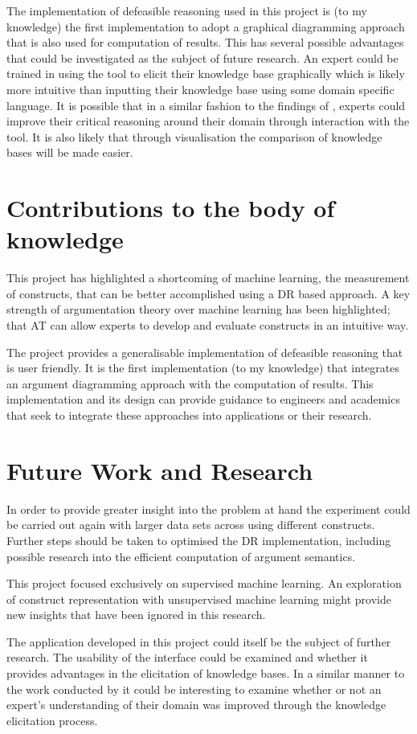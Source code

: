 The implementation of defeasible reasoning used in this project is (to my knowledge) the first implementation to adopt a graphical diagramming approach that is also used for computation of results. This has several possible advantages that could be investigated as the subject of future research. An expert could be trained in using the tool to elicit their knowledge base graphically which is likely more intuitive than inputting their knowledge base using some domain specific language. It is possible that in a similar fashion to the findings of \cite{twardy2004argument}, experts could improve their critical reasoning around their domain through interaction with the tool. It is also likely that through visualisation the comparison of knowledge bases will be made easier. 

\section{Contributions to the body of knowledge}

This project has highlighted a shortcoming of machine learning, the measurement of constructs, that can be better accomplished using a DR based approach. A key strength of argumentation theory over machine learning has been highlighted; that AT can allow experts to develop and evaluate constructs in an intuitive way.

The project provides a generalisable implementation of defeasible reasoning that is user friendly. It is the first implementation (to my knowledge) that integrates an argument diagramming approach with the computation of results. This implementation and its design can provide guidance to engineers and academics that seek to integrate these approaches into applications or their research.

\section{Future Work and Research}

In order to provide greater insight into the problem at hand the experiment could be carried out again with larger data sets across using different constructs. Further steps should be taken to optimised the DR implementation, including possible research into the efficient computation of argument semantics.

This project focused exclusively on supervised machine learning. An exploration of construct representation with unsupervised machine learning might provide new insights that have been ignored in this research.

The application developed in this project could itself be the subject of further research. The usability of the interface could be examined and whether it provides advantages in the elicitation of knowledge bases. In a similar manner to the work conducted by \cite{twardy2004argument} it could be interesting to examine whether or not an expert's understanding of their domain was improved through the knowledge elicitation process.
